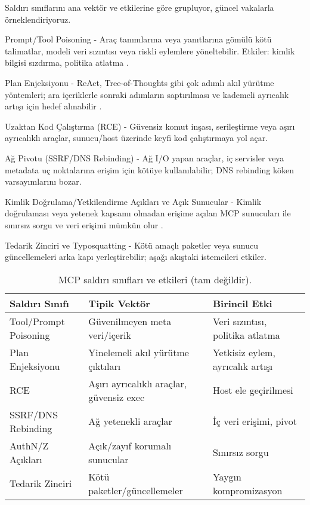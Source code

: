 Saldırı sınıflarını ana vektör ve etkilerine göre grupluyor, güncel vakalarla örneklendiriyoruz.

Prompt/Tool Poisoning
- Araç tanımlarına veya yanıtlarına gömülü kötü talimatlar, modeli veri sızıntısı veya riskli eylemlere yöneltebilir. Etkiler: kimlik bilgisi sızdırma, politika atlatma \cite{arXiv250323278,arXiv250812566}.

Plan Enjeksiyonu
- ReAct, Tree-of-Thoughts gibi çok adımlı akıl yürütme yöntemleri; ara içeriklerle sonraki adımların saptırılması ve kademeli ayrıcalık artışı için hedef alınabilir \cite{arXiv250907595}.

Uzaktan Kod Çalıştırma (RCE)
- Güvensiz komut inşası, serileştirme veya aşırı ayrıcalıklı araçlar, sunucu/host üzerinde keyfi kod çalıştırmaya yol açar.

Ağ Pivotu (SSRF/DNS Rebinding)
- Ağ I/O yapan araçlar, iç servisler veya metadata uç noktalarına erişim için kötüye kullanılabilir; DNS rebinding köken varsayımlarını bozar.

Kimlik Doğrulama/Yetkilendirme Açıkları ve Açık Sunucular
- Kimlik doğrulaması veya yetenek kapsamı olmadan erişime açılan MCP sunucuları ile sınırsız sorgu ve veri erişimi mümkün olur \cite{MDPIElectronics3267}.

Tedarik Zinciri ve Typosquatting
- Kötü amaçlı paketler veya sunucu güncellemeleri arka kapı yerleştirebilir; aşağı akıştaki istemcileri etkiler.

\begin{table}[h]
\centering
\begin{tabular}{@{}lll@{}}
\toprule
Saldırı Sınıfı & Tipik Vektör & Birincil Etki \\
\midrule
Tool/Prompt Poisoning & Güvenilmeyen meta veri/içerik & Veri sızıntısı, politika atlatma \\
Plan Enjeksiyonu & Yinelemeli akıl yürütme çıktıları & Yetkisiz eylem, ayrıcalık artışı \\
RCE & Aşırı ayrıcalıklı araçlar, güvensiz exec & Host ele geçirilmesi \\
SSRF/DNS Rebinding & Ağ yetenekli araçlar & İç veri erişimi, pivot \\
AuthN/Z Açıkları & Açık/zayıf korumalı sunucular & Sınırsız sorgu \\
Tedarik Zinciri & Kötü paketler/güncellemeler & Yaygın kompromizasyon \\
\bottomrule
\end{tabular}
\caption{MCP saldırı sınıfları ve etkileri (tam değildir).}
\label{tab:attacks}
\end{table}

